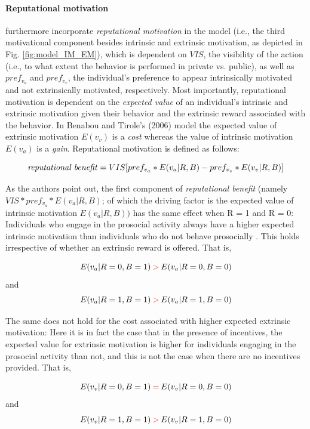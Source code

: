 \documentclass[AER]{AEA}
\begin{document}
\paragraph{Reputational motivation}

\cite{benabou_incentives_2006} furthermore incorporate \textit{reputational motivation} in the model (i.e., the third motivational component besides intrinsic and extrinsic motivation, as depicted in Fig. \ref{fig:model_IM_EM}), which is dependent on $VIS$, the visibility of the action (i.e., to what extent the behavior is performed in private vs. public), as well as $pref_{v_{a}}$ and $pref_{v_{v}}$, the individual’s preference to appear intrinsically motivated and not extrinsically motivated, respectively. Most importantly, reputational motivation is dependent on the \textit{expected value} of an individual’s intrinsic and extrinsic motivation given their behavior and the extrinsic reward associated with the behavior. In Benabou and Tirole’s (2006) model the expected value of extrinsic motivation $E(v_{v})$ is a \textit{cost} whereas the value of intrinsic motivation $E(v_{a})$ is a \textit{gain}. Reputational motivation is defined as follows:

$$ \mbox{\textit{reputational benefit}} =  VIS[pref_{v_{a}} * E(v_{a} | R, B) - pref_{v_{v}} * E(v_{v} | R, B)] $$

As the authors point out, the first component of \textit{reputational benefit} (namely $VIS * pref_{v_{a}} * E(v_{a} | R, B)$; of which the driving factor is the expected value of intrinsic motivation $E(v_{a} | R, B))$ has the same effect when R = 1 and R = 0: Individuals who engage in the prosocial activity always have a higher expected intrinsic motivation than individuals who do not behave prosocially \citep{benabou_incentives_2006}. This holds irrespective of whether an extrinsic reward is offered. That is,

	$$E(v_{a} | R = 0, B = 1) \mathbin{\color{red}>} E(v_{a} | R = 0, B = 0)$$ 
	and
		$$E(v_{a} | R = 1, B = 1) \mathbin{\color{red}>} E(v_{a} | R = 1, B = 0) $$

The same does not hold for the cost associated with higher expected extrinsic motivation: Here it is in fact the case that in the presence of incentives, the expected value for extrinsic motivation is higher for individuals engaging in the prosocial activity than not, and this is not the case when there are no incentives provided. That is,

	$$E(v_{v} | R = 0, B = 1) \mathbin{\color{red}=} E(v_{v} | R = 0, B = 0)$$
	and
		$$E(v_{v} | R = 1, B = 1) \mathbin{\color{red}>} E(v_{v} | R = 1, B = 0) $$
\end{document}
